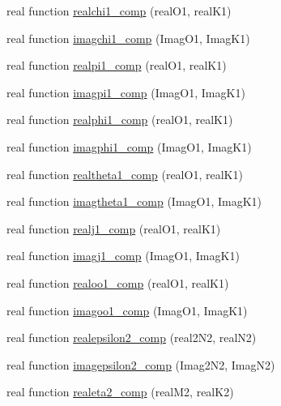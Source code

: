 \begin{DoxyCompactItemize}
real function \mbox{\hyperlink{namespacemodulegauge_ab5f77ac1ee7d3ccaa97fe4e99a711bdb}{realchi1\+\_\+comp}} (real\+O1, real\+K1)
\item 
real function \mbox{\hyperlink{namespacemodulegauge_a681cb9c3664a268964c3c3d9e1aaccfd}{imagchi1\+\_\+comp}} (Imag\+O1, Imag\+K1)
\item 
real function \mbox{\hyperlink{namespacemodulegauge_a09dbdb08ae03c360a014f9a99d18930d}{realpi1\+\_\+comp}} (real\+O1, real\+K1)
\item 
real function \mbox{\hyperlink{namespacemodulegauge_a71b5d5333c564a3344645bef85a9e75b}{imagpi1\+\_\+comp}} (Imag\+O1, Imag\+K1)
\item 
real function \mbox{\hyperlink{namespacemodulegauge_aa6ea15f43448899f9b29ff0b1dfc29db}{realphi1\+\_\+comp}} (real\+O1, real\+K1)
\item 
real function \mbox{\hyperlink{namespacemodulegauge_a0d65a34744a9e60a2568d7e627a69831}{imagphi1\+\_\+comp}} (Imag\+O1, Imag\+K1)
\item 
real function \mbox{\hyperlink{namespacemodulegauge_ad2e8899353e8c890c82e852038be05f9}{realtheta1\+\_\+comp}} (real\+O1, real\+K1)
\item 
real function \mbox{\hyperlink{namespacemodulegauge_a2e204b866f8da90453f9d7af3fd23ec6}{imagtheta1\+\_\+comp}} (Imag\+O1, Imag\+K1)
\item 
real function \mbox{\hyperlink{namespacemodulegauge_a48b5405cff2ce5a1d7821cc09cd69260}{realj1\+\_\+comp}} (real\+O1, real\+K1)
\item 
real function \mbox{\hyperlink{namespacemodulegauge_af198ff90d25c103ae0c6ea8dc688ac4f}{imagj1\+\_\+comp}} (Imag\+O1, Imag\+K1)
\item 
real function \mbox{\hyperlink{namespacemodulegauge_a993e1ea45365954809031bb57945219b}{realoo1\+\_\+comp}} (real\+O1, real\+K1)
\item 
real function \mbox{\hyperlink{namespacemodulegauge_a2916ed439bb6cf0eacf5070d3fc179d7}{imagoo1\+\_\+comp}} (Imag\+O1, Imag\+K1)
\item 
real function \mbox{\hyperlink{namespacemodulegauge_a21ce68783e04b0fd7b9b57cc33bb1117}{realepsilon2\+\_\+comp}} (real2\+N2, real\+N2)
\item 
real function \mbox{\hyperlink{namespacemodulegauge_a28b6b5b37157cb9ca35800eacb09e7fc}{imagepsilon2\+\_\+comp}} (Imag2\+N2, Imag\+N2)
\item 
real function \mbox{\hyperlink{namespacemodulegauge_a56eb9e88f9dfa7360cdf57474d0371d0}{realeta2\+\_\+comp}} (real\+M2, real\+K2)
\item 

\end{DoxyCompactItemize}

